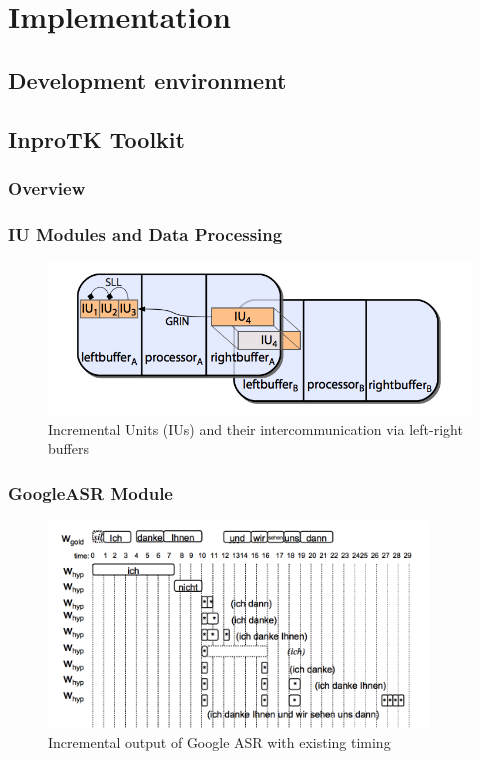 \chapter{Implementation}
\label{chap:implem}
\section {Development environment}
\section {InproTK Toolkit}
\subsection {Overview}
\subsection {IU Modules and Data Processing}
\begin{figure}[htbp]
  \centering
    \includegraphics[width=1.0\textwidth]{images/iuandbuffer.png}
 \caption{ Incremental Units (IUs) and their intercommunication via left-right
 buffers}
  \label{fig:Bild1}
\end {figure}
\subsection {GoogleASR Module}
  \begin{figure}[htbp]
  \centering
   \includegraphics[width=0.9\textwidth]{images/google_output.png}
  \caption{Incremental output of Google ASR with existing timing}
  \label{fig:Bild1}
\end{figure}

